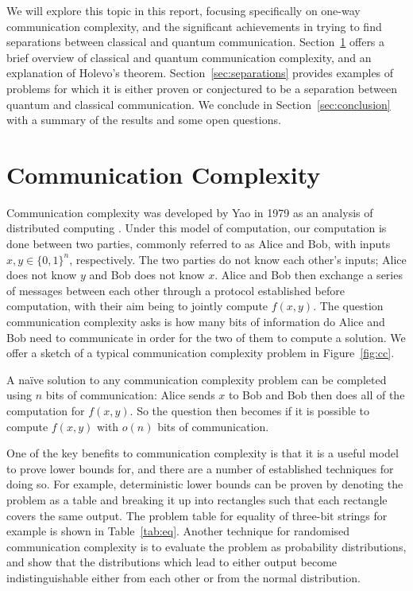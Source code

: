 \documentclass[a4paper]{article}
\begin{document}
        We will explore this topic in this report, focusing specifically on one-way communication complexity, and the significant achievements in trying to find separations between classical and quantum communication. Section~\ref{sec:cc} offers a brief overview of classical and quantum communication complexity, and an explanation of Holevo's theorem. Section~\ref{sec:separations} provides examples of problems for which it is either proven or conjectured to be a separation between quantum and classical communication. We conclude in Section~\ref{sec:conclusion} with a summary of the results and some open questions.

    \section{Communication Complexity}
    \label{sec:cc}

        Communication complexity was developed by Yao in 1979 as an analysis of distributed computing \cite{Yao:1979:CQR:800135.804414}. Under this model of computation, our computation is done between two parties, commonly referred to as Alice and Bob, with inputs $x, y \in \{0, 1\}^n$, respectively. The two parties do not know each other's inputs; Alice does not know $y$ and Bob does not know $x$. Alice and Bob then exchange a series of messages between each other through a protocol established before computation, with their aim being to jointly compute $f(x, y)$. The question communication complexity asks is how many bits of information do Alice and Bob need to communicate in order for the two of them to compute a solution. We offer a sketch of a typical communication complexity problem in Figure~\ref{fig:cc}.

        A na\"{i}ve solution to any communication complexity problem can be completed using $n$ bits of communication: Alice sends $x$ to Bob and Bob then does all of the computation for $f(x, y)$. So the question then becomes if it is possible to compute $f(x, y)$ with $o(n)$ bits of communication.

        One of the key benefits to communication complexity is that it is a useful model to prove lower bounds for, and there are a number of established techniques for doing so. For example, deterministic lower bounds can be proven by denoting the problem as a table and breaking it up into rectangles such that each rectangle covers the same output. The problem table for equality of three-bit strings for example is shown in Table~\ref{tab:eq}. Another technique for randomised communication complexity is to evaluate the problem as probability distributions, and show that the distributions which lead to either output become indistinguishable either from each other or from the normal distribution.
\end{document}
